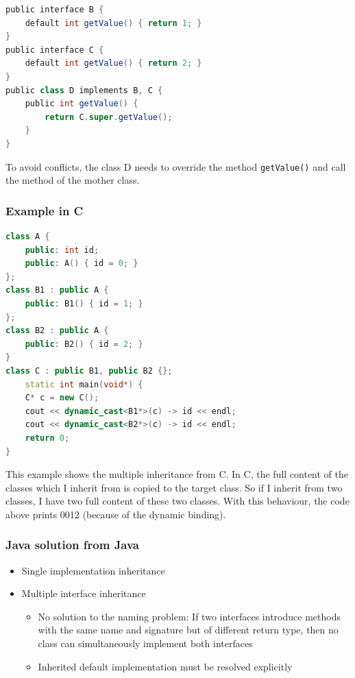 \begin{lstlisting}[language=scala,mathescape=false]
public interface B {
    default int getValue() { return 1; }
}
public interface C {
    default int getValue() { return 2; }
}
public class D implements B, C {
    public int getValue() {
        return C.super.getValue();
    }
}
\end{lstlisting}

To avoid conflicts, the class D needs to override the method
\texttt{getValue()} and call the method of the mother class.

\clearpage
\hypertarget{example-in-c}{%
\subsubsection{Example in C}\label{example-in-c}}

\begin{lstlisting}[language=C++,mathescape=false]
class A {
    public: int id;
    public: A() { id = 0; }
};
class B1 : public A {
    public: B1() { id = 1; }
};
class B2 : public A {
    public: B2() { id = 2; }
}
class C : public B1, public B2 {};
    static int main(void*) {
    C* c = new C();
    cout << dynamic_cast<B1*>(c) -> id << endl;
    cout << dynamic_cast<B2*>(c) -> id << endl;
    return 0;
}
\end{lstlisting}

This example shows the multiple inheritance from C. In C, the full
content of the classes which I inherit from is copied to the target
class. So if I inherit from two classes, I have two full content of
these two classes. With this behaviour, the code above prints 0012
(because of the dynamic binding).

\hypertarget{java-solution-from-java}{%
\subsubsection{Java solution from Java}\label{java-solution-from-java}}

\begin{itemize}
\tightlist
\item
  Single implementation inheritance
\item
  Multiple interface inheritance

  \begin{itemize}
  \tightlist
  \item
    No solution to the naming problem: If two interfaces introduce
    methods with the same name and signature but of different return
    type, then no class can simultaneously implement both interfaces
  \item
    Inherited default implementation must be resolved explicitly
  \end{itemize}
\end{itemize}

